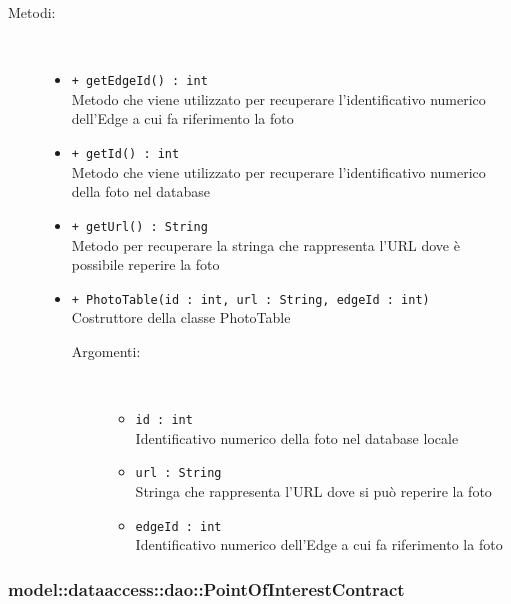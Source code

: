 \documentclass[../DefinizioneDiProdotto.tex]{subfiles}
\begin{document}
\begin{description}
\begin{itemize}
\end{itemize}
\item[Metodi:] \
\begin{itemize}
\item \texttt{+ getEdgeId() : int}\\
Metodo che viene utilizzato per recuperare l'identificativo numerico dell'Edge a cui fa riferimento la foto
 \item \texttt{+ getId() : int}\\
Metodo che viene utilizzato per recuperare l'identificativo numerico della foto nel database
 \item \texttt{+ getUrl() : String}\\
Metodo per recuperare la stringa che rappresenta l'URL dove è possibile reperire la foto 
 \item \texttt{+ PhotoTable(id : int, url : String, edgeId : int)}\\
Costruttore della classe PhotoTable
 \begin{description}
\item[Argomenti:] \
\begin{itemize}
\item \texttt{id : int}\\
Identificativo numerico della foto nel database locale\item \texttt{url : String}\\
Stringa che rappresenta l'URL dove si può reperire la foto\item \texttt{edgeId : int}\\
Identificativo numerico dell'Edge a cui fa riferimento la foto\end{itemize}
\end{description}
\end{itemize}
\end{description}

\subsubsection{model::dataaccess::dao::PointOfInterestContract}
\end{document}
